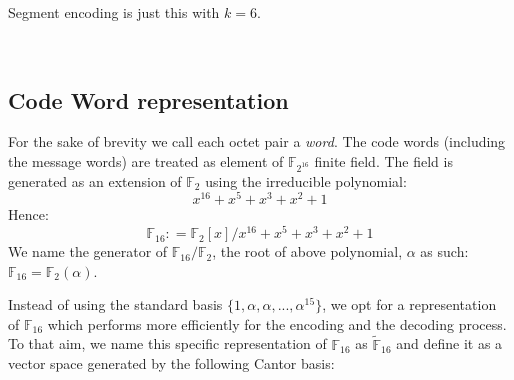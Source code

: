 Segment encoding is just this with $k = 6$.

\

\subsection{Code Word representation }

For the sake of brevity we call each octet pair a \emph{word}. The code words (including the message words) are treated as element of
$\mathbb{F}_{2^{16}}$ finite field. The field is generated as an extension of
$\mathbb{F}_2$ using the irreducible polynomial:
\[ x^{16} + x^5 + x^3 + x^2 + 1 \]
Hence:
\[ \mathbb{F}_{16} : =\mathbb{F}_2 [x] / x^{16} + x^5 + x^3 + x^2 + 1 \]
We name the generator of $\mathbb{F}_{16} /\mathbb{F}_2$, the root of above
polynomial, $\alpha$ as such: $\mathbb{F}_{16} =\mathbb{F}_2 (\alpha)$.

Instead of using the standard basis $\{1,\alpha, \alpha,...,\alpha^{15}\}$, we opt for a representation of $\mathbb{F}_{16}$ which performs more efficiently for the encoding and the decoding process. To that aim, we name this specific representation of $\mathbb{F}_{16}$ as $\tilde{\mathbb{F}}_{16}$ and define it as a vector space generated by the following Cantor basis:

